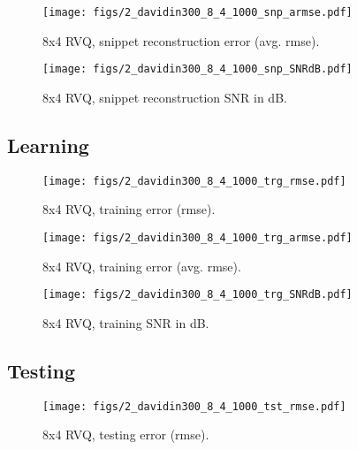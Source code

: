 								\begin{figure}[h!]
								\centering
								\texttt{[image: figs/2\_davidin300\_8\_4\_1000\_snp\_armse.pdf]}
								\caption{8x4 RVQ, snippet reconstruction error (avg. rmse).}
								\label{fig:2_davidin300_8_4_1000_snp_armse}
								\end{figure}

								\begin{figure}[h!]
								\centering
								\texttt{[image: figs/2\_davidin300\_8\_4\_1000\_snp\_SNRdB.pdf]}
								\caption{8x4 RVQ, snippet reconstruction SNR in dB.}
								\label{fig:2_davidin300_8_4_1000_snp_SNRdB}
								\end{figure}
\clearpage
\newpage
\subsection{Learning}

								\begin{figure}[h!]
								\centering
								\texttt{[image: figs/2\_davidin300\_8\_4\_1000\_trg\_rmse.pdf]}
								\caption{8x4 RVQ, training error (rmse).}
								\label{fig:2_davidin300_8_4_1000_trg_rmse}
								\end{figure}


								\begin{figure}[h!]
								\centering
								\texttt{[image: figs/2\_davidin300\_8\_4\_1000\_trg\_armse.pdf]}
								\caption{8x4 RVQ, training error (avg. rmse).}
								\label{fig:2_davidin300_8_4_1000_trg_armse}
								\end{figure}

								\begin{figure}[h!]
								\centering
								\texttt{[image: figs/2\_davidin300\_8\_4\_1000\_trg\_SNRdB.pdf]}
								\caption{8x4 RVQ, training SNR in dB.}
								\label{fig:2_davidin300_8_4_1000_trg_SNRdB}
								\end{figure}
\clearpage
\newpage
\subsection{Testing}
								\begin{figure}[h!]
								\centering
								\texttt{[image: figs/2\_davidin300\_8\_4\_1000\_tst\_rmse.pdf]}
								\caption{8x4 RVQ, testing error (rmse).}
								\label{fig:2_davidin300_8_4_1000_tst_rmse}
								\end{figure}


